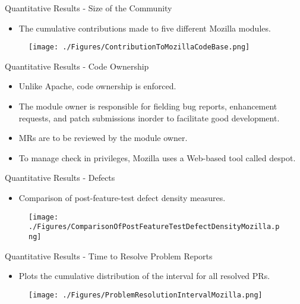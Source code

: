 \documentclass{beamer}
\begin{document}
\begin{frame}{Quantitative Results - Size of the Community}
\begin{itemize}
	\item The cumulative contributions made to five different Mozilla modules.
\end{itemize}
\begin{figure}
	\texttt{[image: ./Figures/ContributionToMozillaCodeBase.png]}
\end{figure}
\end{frame}

\begin{frame}{Quantitative Results - Code Ownership}
\begin{itemize}
	\item Unlike Apache, code ownership is enforced. \pause
	\item The module owner is responsible for fielding bug reports, enhancement requests, and patch submissions inorder to facilitate good development.\pause
	\item MRs are to be reviewed by the module owner.\pause
	\item To manage check in privileges, Mozilla uses a Web-based tool called
despot.
\end{itemize}
\end{frame}

\begin{frame}{Quantitative Results - Defects}
\begin{itemize}
	\item Comparison of post-feature-test defect density measures.
\end{itemize}
\begin{figure}
	\texttt{[image: ./Figures/ComparisonOfPostFeatureTestDefectDensityMozilla.png]}
\end{figure}
\end{frame}

\begin{frame}{Quantitative Results - Time to Resolve Problem Reports}
\begin{itemize}
	\item Plots the cumulative distribution of the interval for all resolved PRs.
\end{itemize}
\begin{figure}
	\texttt{[image: ./Figures/ProblemResolutionIntervalMozilla.png]}
\end{figure}
\end{frame}
\end{document}
